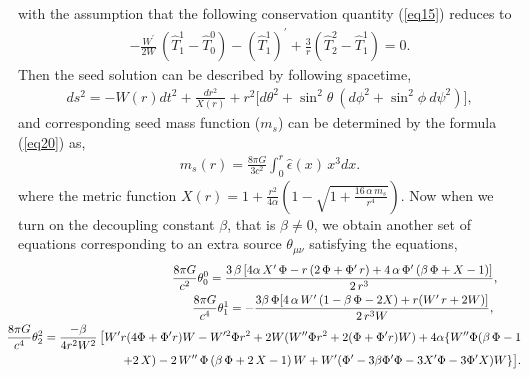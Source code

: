 \documentclass[]{aastex631}
\begin{document}
with the  assumption that the following  conservation quantity (\ref{eq15}) reduces to
\begin{eqnarray}
-\frac{W^\prime}{2W}\,(\hat{T}^1_1-\hat{T}^0_0)-(\hat{T}^1_1)^\prime+\frac{3}{r}(\hat{T}^2_2-\hat{T}^1_1)=0.  \label{eq28}
\end{eqnarray}
Then the seed solution can be described by following spacetime,
\begin{eqnarray}
ds^2=- W(r) dt^2 + \frac{ dr^2 }{X(r)}+ r^{2}\big[d \theta^2+\sin^2 \theta ~(d\phi^2+\sin^2 \phi ~d\psi^2) \big], \label{eq29} 
\end{eqnarray}
and corresponding seed mass function ($m_s$) can be determined by the formula (\ref{eq20}) as,
\begin{eqnarray}
m_s(r)=\frac{8\pi G}{3c^2} \int^r_0 \hat{\epsilon}(x)\, x^3 dx.  \label{eq30}
\end{eqnarray}
where the metric function $X(r)=1+\frac{r^2}{4 \alpha}
\left(1-\sqrt{1+\frac{16\,\alpha\, m_s}{r^4}}\right)$. Now when we turn on the decoupling constant $\beta$, that is $\beta \neq 0$, we obtain another set of equations corresponding to an extra source $\theta_{\mu\nu}$ satisfying the equations, 
\begin{eqnarray}
&&\hspace{-0.7cm}\frac{8\pi G }{c^2} \theta_0^0 = \frac{3\, \beta\, [4 \alpha\,X^\prime\,\Phi-r \,(2\, \Phi + \Phi^\prime\, r) + 4 \,\alpha\, \Phi^\prime\, (\beta\, \Phi + X-1)]}{2\,r^3}, ~~~~~~\label{eq31}\\
 &&\hspace{-0.7cm}\frac{8\pi G }{c^4}\theta_1^1 = -\frac{3 \beta\,\Phi [4 \,\alpha\, W^\prime\, (1 - \beta\, \Phi -2 X) + r (W^\prime\, r + 2 W)]}{2\,r^3 W},~~~~~~~\label{eq32}\\
&&\hspace{-0.7cm} \frac{8\pi G }{c^4} \theta_2^2 = \frac{-\beta}{4r^2W^2}\,\big[W^\prime r (4 \Phi + \Phi^\prime r) W -W^{\prime 2} \Phi r^2 + 
   2 W (W^{\prime\prime} \Phi r^2 + 2 (\Phi + \Phi^\prime r) W) + 
   4 \alpha \{W^{\prime\prime} \Phi ( \beta\, \Phi -1 \nonumber\\&& \hspace{0.8cm} + 2\, X) - 2\, W^{\prime\prime}\, \Phi\, (\beta\, \Phi + 2\, X-1)\, W + 
      W^\prime (\Phi^\prime - 3 \beta \Phi^\prime \Phi - 3 X^\prime \Phi - 3 \Phi^\prime X) W\}\big]. \label{eq33}
\end{eqnarray}
\end{document}
